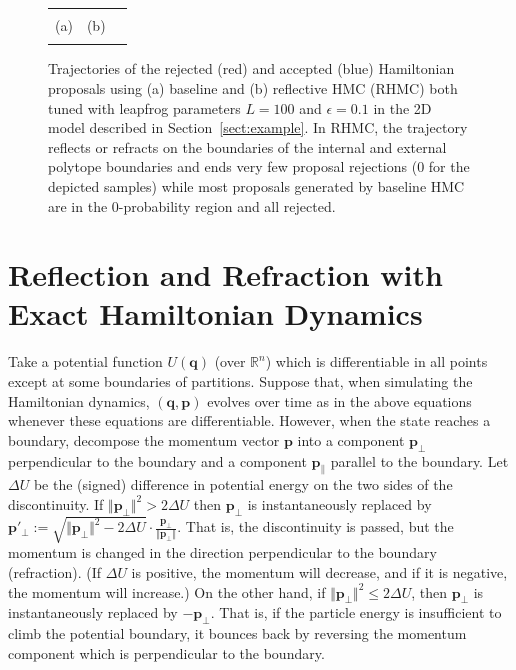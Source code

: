 \documentclass{article} %
\newcommand{\bvec}[1]{\textbf{#1}}
\begin{document}
\begin{figure}[t!]
\begin{center}
\begin{tabular}{ccc}
\vspace{-1.5mm}
\\
   \hspace{-5mm} \footnotesize(a) 
& \hspace{-4mm} \footnotesize(b) 
\\
\multicolumn{2}{c}{}
\end{tabular}
\end{center}
\vspace{-8mm}
\caption{\footnotesize
Trajectories of the rejected (red) and accepted (blue) Hamiltonian proposals using (a) baseline and (b) reflective HMC (RHMC) both tuned with leapfrog parameters $L=100$ and $\epsilon=0.1$ in the 2D model described in Section~\ref{sect:example}. 
In RHMC, the trajectory reflects or refracts on the boundaries of the internal and external polytope boundaries and ends very few proposal rejections (0 for the depicted samples) while most proposals generated by baseline HMC are in the 0-probability region and all rejected.   
} 
\label{fig:mom}
\vspace{-10pt}
\end{figure}
\section{Reflection and Refraction with Exact Hamiltonian Dynamics}


Take a potential function $U(\bvec{q})$ (over $\mathbb{R}^n$) which is differentiable in all points except at some boundaries of partitions.  Suppose that, when simulating the Hamiltonian dynamics, $(\bvec{q}, \bvec{p})$ evolves over time as in the above equations whenever these equations are differentiable.  However, when the state reaches a boundary, decompose the momentum vector $\bvec{p}$ into a component $\bvec{p}_\perp$ perpendicular to the boundary and a component $\bvec{p}_\parallel$ parallel to the boundary.  
Let $\Delta U$ be the (signed) difference in potential energy on the two sides of the discontinuity.   If $\Vert \bvec{p}_\perp \Vert^2 > 2\Delta U$ then $\bvec{p}_\perp$ is instantaneously replaced by $\bvec{p}'_\perp := \sqrt{ \Vert \bvec{p}_\perp \Vert^2 - 2 \Delta U} \cdot \frac{\bvec{p}_\perp}{\Vert \bvec{p}_\perp \Vert}$. 
That is, the discontinuity is passed, but the momentum is changed in the direction perpendicular to the boundary (refraction).  (If $\Delta U$ is positive, the momentum will decrease, and if it is negative, the momentum will increase.)  On the other hand, if $\Vert \bvec{p}_\perp \Vert^2 \leq 2\Delta U$, then $\bvec{p}_\perp$ is instantaneously replaced by $-\bvec{p}_\perp$.  That is, if the particle energy is insufficient to climb the potential boundary, it bounces back by reversing the momentum component which is perpendicular to the boundary.
\end{document}
